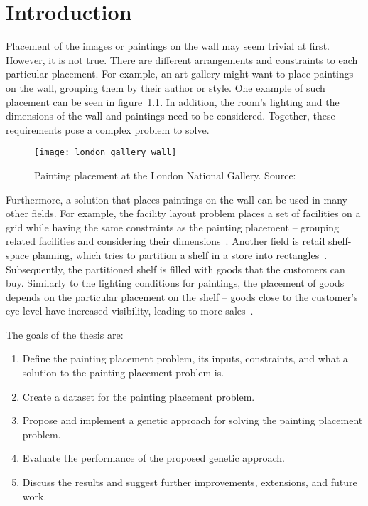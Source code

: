 \chapter{Introduction}\label{ch:introduction}

Placement of the images or paintings on the wall may seem trivial at first.
However, it is not true.
There are different arrangements and constraints to each particular placement.
For example, an art gallery might want to place paintings on the wall, grouping them by their author or style.
One example of such placement can be seen in figure~\ref{fig:london-wall}.
In addition, the room's lighting and the dimensions of the wall and paintings need to be considered.
Together, these requirements pose a complex problem to solve.

\begin{figure}[]
    \texttt{[image: london\_gallery\_wall]}
    \caption[Painting placement at the London National Gallery]{Painting placement at the London National Gallery. Source:~\cite{ScreenshotWallGoogle}}
    \label{fig:london-wall}
\end{figure}


Furthermore, a solution that places paintings on the wall can be used in many other fields.
For example, the facility layout problem places a set of facilities on a grid
while having the same constraints as the painting placement – grouping related facilities and considering their dimensions~\cite{goncalvesBiasedRandomkeyGenetic2015}.
Another field is retail shelf-space planning, which tries to partition a shelf in a store into rectangles~\cite{yangStudyShelfSpace1999}.
Subsequently, the partitioned shelf is filled with goods that the customers can buy.
Similarly to the lighting conditions for paintings, the placement of goods depends on the
particular placement on the shelf – goods close to the customer's eye level have increased visibility, leading to more sales~\cite{hwangGeneticAlgorithmApproach2009}.


The goals of the thesis are:

\begin{enumerate}
    \item Define the painting placement problem, its inputs, constraints, and what a solution to the painting placement problem is.
    \item Create a dataset for the painting placement problem.
    \item Propose and implement a genetic approach for solving the painting placement problem.
    \item Evaluate the performance of the proposed genetic approach.
    \item Discuss the results and suggest further improvements, extensions, and future work.
\end{enumerate}

